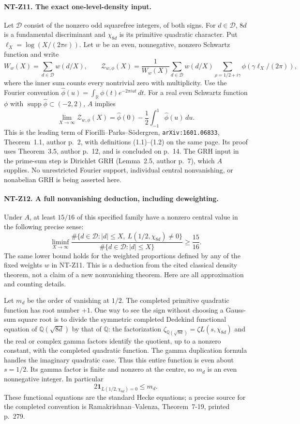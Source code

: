 \paragraph{NT-Z11. The exact one-level-density input.}
Let $\mathcal D$ consist of the nonzero odd squarefree integers, of both
signs.  For $d\in\mathcal D$, $8d$ is a fundamental discriminant and
$\chi_{8d}$ is its primitive quadratic character.  Put
$\ell_X=\log(X/(2\pi e))$.  Let $w$ be an even, nonnegative, nonzero
Schwartz function and write
\[
 W_w(X)=\sum_{d\in\mathcal D}w(d/X),\qquad
 \mathcal Z_{w,\phi}(X)=\frac1{W_w(X)}
  \sum_{d\in\mathcal D}w(d/X)
       \sum_{\rho=1/2+i\gamma}\phi(\gamma\ell_X/(2\pi)),
\]
where the inner sum counts every nontrivial zero with multiplicity.
Use the Fourier convention
$\widehat\phi(u)=\int_{\mathbb R}\phi(t)e^{-2\pi iut}\,dt$.
For a real even Schwartz function $\phi$ with
$\operatorname{supp}\widehat\phi\subset(-2,2)$, $A$ implies
\[
 \lim_{X\to\infty}\mathcal Z_{w,\phi}(X)
 =\widehat\phi(0)-\frac12\int_{-1}^1\widehat\phi(u)\,du.
\tag{NT-Z11}
\]
This is the leading term of Fiorilli--Parks--S\"odergren,
\texttt{arXiv:1601.06833}, Theorem~1.1, author p.~2, with definitions
(1.1)--(1.2) on the same page.  Its proof uses Theorem~3.5, author p.~12, and is concluded on p.~14.
The GRH input in the prime-sum step is Dirichlet GRH
(Lemma~2.5, author p.~7), which $A$ supplies.  No unrestricted Fourier
support, individual central nonvanishing, or nonabelian GRH is being
asserted here.

\paragraph{NT-Z12. A full nonvanishing deduction, including deweighting.}
Under $A$, at least $15/16$ of this specified family have a nonzero
central value in the following precise sense:
\[
 \liminf_{X\to\infty}
 \frac{\#\{d\in\mathcal D:|d|\le X,\ L(1/2,\chi_{8d})\ne0\}}
      {\#\{d\in\mathcal D:|d|\le X\}}\ge\frac{15}{16}.
\tag{NT-Z12}
\]
The same lower bound holds for the weighted proportions defined by any
of the fixed weights $w$ in NT-Z11.  This is a deduction from the cited
classical density theorem, not a claim of a new nonvanishing theorem.
Here are all approximation and counting details.

Let $m_d$ be the order of vanishing at $1/2$.  The completed primitive
quadratic function has root number $+1$.  One way to see the sign without
choosing a Gauss-sum square root is to divide the symmetric completed
Dedekind functional equation of $\mathbb Q(\sqrt{8d})$ by that of
$\mathbb Q$: the factorization
$\zeta_{\mathbb Q(\sqrt{8d})}=\zeta L(s,\chi_{8d})$ and the real or
complex gamma factors identify the quotient, up to a nonzero constant,
with the completed quadratic function.  The gamma duplication formula
handles the imaginary quadratic case.  Thus this entire function is
even about $s=1/2$.  Its gamma factor is finite and nonzero at the
centre, so $m_d$ is an even nonnegative integer.  In particular
\[
 2\mathbf1_{L(1/2,\chi_{8d})=0}\le m_d.
\tag{NT-central-parity}
\]
These functional equations are the standard Hecke equations; a precise
source for the completed convention is Ramakrishnan--Valenza,
Theorem~7-19, printed p.~279.

